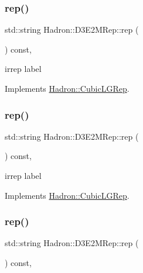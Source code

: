 \subsubsection{\texorpdfstring{rep()}{rep()}\hspace{0.1cm}{\footnotesize\ttfamily [1/3]}}
{\footnotesize\ttfamily std\+::string Hadron\+::\+D3\+E2\+M\+Rep\+::rep (\begin{DoxyParamCaption}{ }\end{DoxyParamCaption}) const\hspace{0.3cm}{\ttfamily [inline]}, {\ttfamily [virtual]}}

irrep label 

Implements \mbox{\hyperlink{structHadron_1_1CubicLGRep_a50f5ddbb8f4be4cee0106fa9e8c75e6c}{Hadron\+::\+Cubic\+L\+G\+Rep}}.

\mbox{\label{structHadron_1_1D3E2MRep_aa19ff7cb3edd937564ed3bbb3c9fe36b}} 
\subsubsection{\texorpdfstring{rep()}{rep()}\hspace{0.1cm}{\footnotesize\ttfamily [2/3]}}
{\footnotesize\ttfamily std\+::string Hadron\+::\+D3\+E2\+M\+Rep\+::rep (\begin{DoxyParamCaption}{ }\end{DoxyParamCaption}) const\hspace{0.3cm}{\ttfamily [inline]}, {\ttfamily [virtual]}}

irrep label 

Implements \mbox{\hyperlink{structHadron_1_1CubicLGRep_a50f5ddbb8f4be4cee0106fa9e8c75e6c}{Hadron\+::\+Cubic\+L\+G\+Rep}}.

\mbox{\label{structHadron_1_1D3E2MRep_aa19ff7cb3edd937564ed3bbb3c9fe36b}} 
\subsubsection{\texorpdfstring{rep()}{rep()}\hspace{0.1cm}{\footnotesize\ttfamily [3/3]}}
{\footnotesize\ttfamily std\+::string Hadron\+::\+D3\+E2\+M\+Rep\+::rep (\begin{DoxyParamCaption}{ }\end{DoxyParamCaption}) const\hspace{0.3cm}{\ttfamily [inline]}, {\ttfamily [virtual]}}

